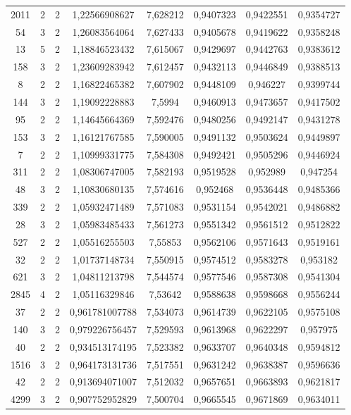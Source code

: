 \begin{longtable}{|c|c|c|c|c|c|c|c|}
2011 & 2 & 2 & 1,22566908627 & 7,628212 & 0,9407323 & 0,9422551 & 0,9354727 \\
54 & 3 & 2 & 1,26083564064 & 7,627433 & 0,9405678 & 0,9419622 & 0,9358248 \\
13 & 5 & 2 & 1,18846523432 & 7,615067 & 0,9429697 & 0,9442763 & 0,9383612 \\
158 & 3 & 2 & 1,23609283942 & 7,612457 & 0,9432113 & 0,9446849 & 0,9388513 \\
8 & 2 & 2 & 1,16822465382 & 7,607902 & 0,9448109 & 0,946227 & 0,9399744 \\
144 & 3 & 2 & 1,19092228883 & 7,5994 & 0,9460913 & 0,9473657 & 0,9417502 \\
95 & 2 & 2 & 1,14645664369 & 7,592476 & 0,9480256 & 0,9492147 & 0,9431278 \\
153 & 3 & 2 & 1,16121767585 & 7,590005 & 0,9491132 & 0,9503624 & 0,9449897 \\
7 & 2 & 2 & 1,10999331775 & 7,584308 & 0,9492421 & 0,9505296 & 0,9446924 \\
311 & 2 & 2 & 1,08306747005 & 7,582193 & 0,9519528 & 0,952989 & 0,947254 \\
48 & 3 & 2 & 1,10830680135 & 7,574616 & 0,952468 & 0,9536448 & 0,9485366 \\
339 & 2 & 2 & 1,05932471489 & 7,571083 & 0,9531154 & 0,9542021 & 0,9486882 \\
28 & 3 & 2 & 1,05983485433 & 7,561273 & 0,9551342 & 0,9561512 & 0,9512822 \\
527 & 2 & 2 & 1,05516255503 & 7,55853 & 0,9562106 & 0,9571643 & 0,9519161 \\
32 & 2 & 2 & 1,01737148734 & 7,550915 & 0,9574512 & 0,9583278 & 0,953182 \\
621 & 3 & 2 & 1,04811213798 & 7,544574 & 0,9577546 & 0,9587308 & 0,9541304 \\
2845 & 4 & 2 & 1,05116329846 & 7,53642 & 0,9588638 & 0,9598668 & 0,9556244 \\
37 & 2 & 2 & 0,961781007788 & 7,534073 & 0,9614739 & 0,9622105 & 0,9575108 \\
140 & 3 & 2 & 0,979226756457 & 7,529593 & 0,9613968 & 0,9622297 & 0,957975 \\
40 & 2 & 2 & 0,934513174195 & 7,523382 & 0,9633707 & 0,9640348 & 0,9594812 \\
1516 & 3 & 2 & 0,964173131736 & 7,517551 & 0,9631242 & 0,9638387 & 0,9596636 \\
42 & 2 & 2 & 0,913694071007 & 7,512032 & 0,9657651 & 0,9663893 & 0,9621817 \\
4299 & 3 & 2 & 0,907752952829 & 7,500704 & 0,9665545 & 0,9671869 & 0,9634011 \\

\end{longtable}
